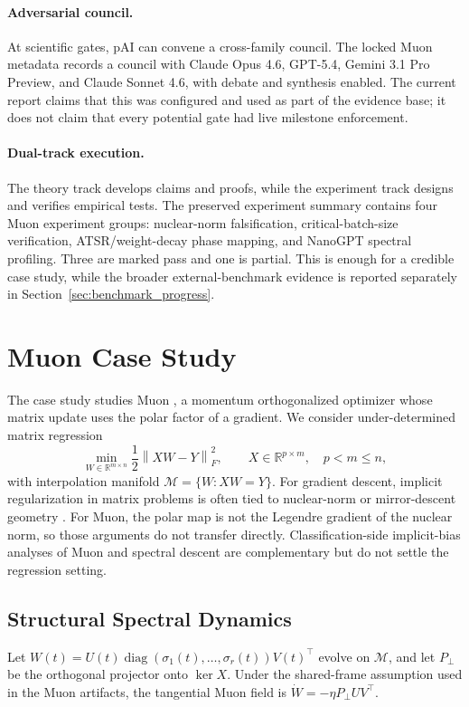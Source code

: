 \documentclass{article}
\newcommand{\R}{\mathbb{R}}
\newcommand{\M}{\mathcal{M}}
\newcommand{\Pperp}{P_{\perp}}
\newcommand{\fro}[1]{\left\lVert #1 \right\rVert_F}
\begin{document}
\paragraph{Adversarial council.}
At scientific gates, pAI can convene a cross-family council. The locked Muon metadata records a council with Claude Opus 4.6, GPT-5.4, Gemini 3.1 Pro Preview, and Claude Sonnet 4.6, with debate and synthesis enabled. The current report claims that this was configured and used as part of the evidence base; it does not claim that every potential gate had live milestone enforcement.

\paragraph{Dual-track execution.}
The theory track develops claims and proofs, while the experiment track designs and verifies empirical tests. The preserved experiment summary contains four Muon experiment groups: nuclear-norm falsification, critical-batch-size verification, ATSR/weight-decay phase mapping, and NanoGPT spectral profiling. Three are marked pass and one is partial. This is enough for a credible case study, while the broader external-benchmark evidence is reported separately in Section~\ref{sec:benchmark_progress}.

\section{Muon Case Study}
\label{sec:muon}
The case study studies Muon \citep{jordan2024muon}, a momentum orthogonalized optimizer whose matrix update uses the polar factor of a gradient. We consider under-determined matrix regression
\[
  \min_{W\in\R^{m\times n}}\frac{1}{2}\fro{XW-Y}^2,\qquad
  X\in\R^{p\times m},\quad p<m\le n,
\]
with interpolation manifold $\M=\{W:XW=Y\}$. For gradient descent, implicit regularization in matrix problems is often tied to nuclear-norm or mirror-descent geometry \citep{gunasekar2018implicitly,arora2019implicit}. For Muon, the polar map is not the Legendre gradient of the nuclear norm, so those arguments do not transfer directly. Classification-side implicit-bias analyses of Muon and spectral descent \citep{fan2025muon,gronich2026muon} are complementary but do not settle the regression setting.

\subsection{Structural Spectral Dynamics}
\label{sec:theorem1}
Let $W(t)=U(t)\operatorname{diag}(\sigma_1(t),\ldots,\sigma_r(t))V(t)^\top$ evolve on $\M$, and let $\Pperp$ be the orthogonal projector onto $\ker X$. Under the shared-frame assumption used in the Muon artifacts, the tangential Muon field is $\dot W=-\eta \Pperp UV^\top$.
\end{document}
